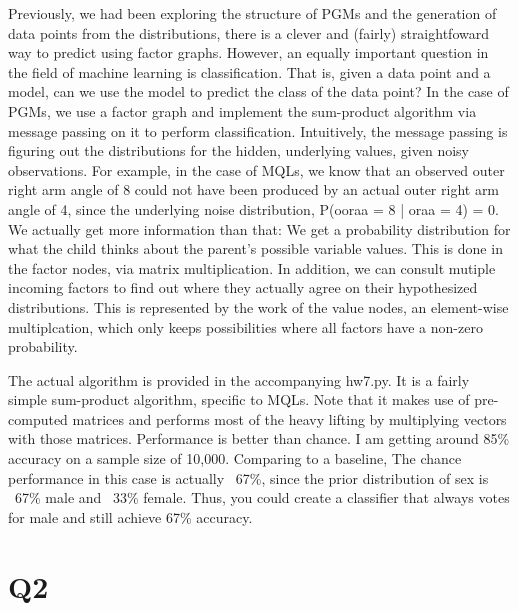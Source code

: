 \documentclass{article}
\begin{document}
Previously, we had been exploring the structure of PGMs and the 
generation of data points from the distributions, there is a clever and (fairly) 
straightfoward way to predict using factor graphs. However, an equally important 
question in the field of machine learning is classification. That is, given a 
data point and a model, can we use the model to predict the class of the data 
point? In the case of PGMs, we use a factor graph and implement the sum-product 
algorithm via message passing on it to perform classification. Intuitively, the 
message passing is figuring out the distributions for the hidden, underlying values, 
given noisy observations. For example, in the case of MQLs, we know that an observed outer 
right arm angle of 8 could not have been produced by an actual outer right arm 
angle of 4, since the underlying noise distribution, P(ooraa = 8 | oraa = 4) = 0. 
We actually get more information than that: We get a probability distribution 
for what the child thinks about the parent's possible variable values. This is 
done in the factor nodes, via matrix multiplication.
In addition, we can consult mutiple incoming factors to find out where they 
actually agree on their hypothesized distributions. This is represented by the 
work of the value nodes, an element-wise multiplcation, which only keeps 
possibilities where all factors have a non-zero probability.

The actual algorithm is provided in the accompanying hw7.py. It is a fairly 
simple sum-product algorithm, specific to MQLs. Note 
that it makes use of pre-computed matrices and performs most of the heavy 
lifting by multiplying vectors with those matrices. Performance is better than 
chance. I am getting around 85\% accuracy on a sample size of 10,000. Comparing 
to a baseline, The chance performance in this case is actually ~67\%, since the 
prior distribution of sex is ~67\% male and ~33\% female. Thus, you could create 
a classifier that always votes for male and still achieve 67\% accuracy.

\section{Q2}
\end{document}
